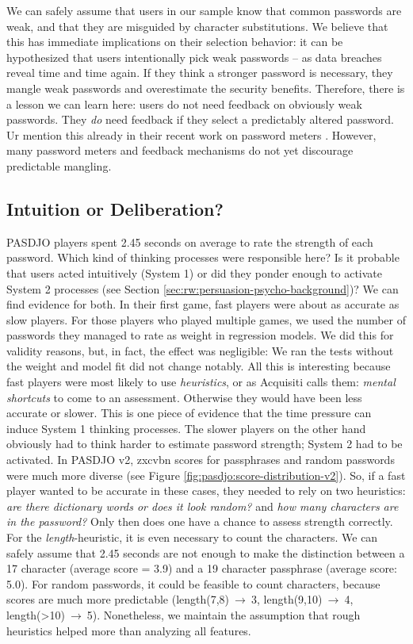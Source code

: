 We can safely assume that users in our sample know that common passwords are weak, and that they are misguided by character substitutions. We believe that this has immediate implications on their selection behavior: it can be hypothesized that users intentionally pick weak passwords -- as data breaches reveal time and time again. If they think a stronger password is necessary, they mangle weak passwords and overestimate the security benefits. Therefore, there is a lesson we can learn here: users do not need feedback on obviously weak passwords. They \textit{do} need feedback if they select a predictably altered password. Ur \etal mention this already in their recent work on password meters \cite{Ur2017DataDrivenPWMeter}. However, many password meters and feedback mechanisms do not yet discourage predictable mangling. 

\subsection{Intuition or Deliberation?}
PASDJO players spent 2.45 seconds on average to rate the strength of each password. Which kind of thinking processes were responsible here? Is it probable that users acted intuitively (System 1) or did they ponder enough to activate System 2 processes (see Section \ref{sec:rw:persuasion-psycho-background})? We can find evidence for both. 
In their first game, fast players were about as accurate as slow players. For those players who played multiple games, we used the number of passwords they managed to rate as weight in regression models. We did this for validity reasons, but, in fact, the effect was negligible: We ran the tests without the weight and model fit did not change notably. All this is interesting because fast players were most likely to use \textit{heuristics}, or as Acquisiti \etal calls them: \textit{mental shortcuts} to come to an assessment. Otherwise they would have been less accurate or slower. This is one piece of evidence that the time pressure can induce System 1 thinking processes. The slower players on the other hand obviously had to think harder to estimate password strength; System 2 had to be activated. 
In PASDJO v2, zxcvbn scores for passphrases and random passwords were much more diverse (see Figure \ref{fig:pasdjo:score-distribution-v2}). So, if a fast player wanted to be accurate in these cases, they needed to rely on two heuristics: \textit{are there dictionary words or does it look random?} and \textit{how many characters are in the password?} Only then does one have a chance to assess strength correctly. For the \textit{length}-heuristic, it is even necessary to count the characters. We can safely assume that 2.45 seconds are not enough to make the distinction between a 17 character (average score = 3.9) and a 19 character passphrase (average score: 5.0). For random passwords, it could be feasible to count characters, because scores are much more predictable (length(7,8)$~\rightarrow~$3, length(9,10)$~\rightarrow~$4, length(>10)$~\rightarrow~$5). Nonetheless, we maintain the assumption that rough heuristics helped more than analyzing all features. 

